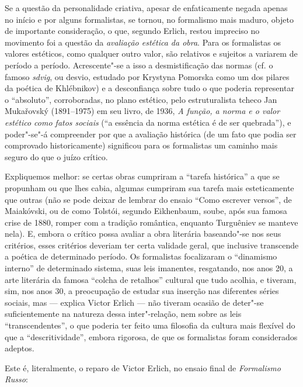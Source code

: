 Se a questão da personalidade criativa, apesar de enfaticamente negada apenas no início e por
alguns formalistas, se tornou, no formalismo mais
maduro, objeto de importante consideração, o que, segundo Erlich, restou impreciso no movimento foi a questão da \emph{avaliação estética da obra}. Para os formalistas os valores
estéticos, como qualquer outro valor, são relativos e sujeitos a
variarem de período a período. Acrescente"-se a isso a desmistificação das
normas (cf. o famoso \emph{sdvig}, ou desvio, estudado por Krystyna
Pomorska como um dos pilares da poética de Khlébnikov) e a desconfiança
sobre tudo o que poderia representar o ``absoluto'', corroboradas,
no plano estético, pelo estruturalista tcheco Jan
Mukařovský (1891--1975) em seu livro, de 1936, \emph{A função, a norma e o valor
estético como fatos sociais} (``a essência da norma estética é de ser
quebrada''), e poder"-se"-á compreender por que a avaliação histórica (de
um fato que podia ser comprovado historicamente) significou para os
formalistas um caminho mais seguro do que o juízo crítico.

Expliquemos melhor: se certas obras cumpriram a
``tarefa histórica'' a que se propunham ou que lhes cabia, algumas cumpriram sua tarefa mais
esteticamente que outras (não se pode deixar de lembrar do ensaio ``Como escrever versos'', de
Maiakóvski, ou de como Tolstói, segundo Eikhenbaum, soube, após sua famosa crise de 1880, romper com a tradição romântica, enquanto
Turguêniev se manteve nela). E, embora o crítico possa avaliar a obra
literária baseando"-se nos seus critérios, esses critérios deveriam ter
certa validade geral, que inclusive transcende a poética de determinado
período. Os formalistas focalizaram o ``dinamismo interno'' de determinado sistema, suas leis imanentes, resgatando, nos anos 20, a
arte literária da famosa ``colcha de retalhos'' cultural que tudo
acolhia, e tiveram, sim, nos anos 30, a preocupação de estudar sua
inserção nas diferentes séries sociais, mas --- explica Victor Erlich ---
não tiveram ocasião de deter"-se suficientemente na natureza dessa
inter"-relação, nem sobre as leis ``transcendentes'', o que poderia
ter feito uma filosofia da cultura mais flexível do que a
``descritividade'', embora rigorosa, de que os formalistas foram considerados
adeptos.

Este é, literalmente, o reparo de Victor Erlich, no ensaio final de
\emph{Formalismo Russo}:

